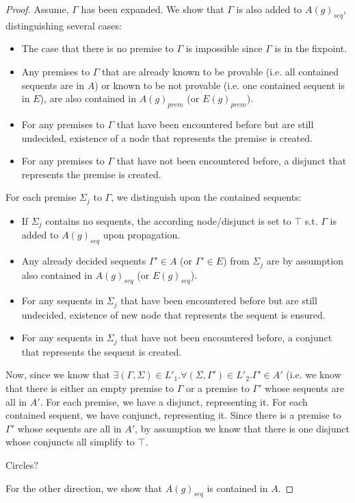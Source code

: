 \documentclass{llncs}
\begin{document}
\begin{lemma}
\begin{proof}
Assume, $\Gamma$ has been expanded. We show that $\Gamma$ is also added to $A(g)_{seq}$, distinguishing
several cases:
\begin{itemize}
\item The case that there is no premise to $\Gamma$ is impossible since $\Gamma$ is in the fixpoint.
\item Any premises to $\Gamma$ that are already known to be provable (i.e. all contained sequents are in $A$) or known to be 
not provable (i.e. one contained sequent is in $E$), are also contained in $A(g)_{prem}$ (or $E(g)_{prem}$).
\item For any premises to $\Gamma$ that have been encountered before but are still undecided, existence of a node that represents the
premise is created.
\item For any premises to $\Gamma$ that have not been encountered before, a disjunct that represents the
premise is created.
\end{itemize}
For each premise $\Sigma_j$ to $\Gamma$, we distinguish upon the contained sequents:
\begin{itemize}
\item If $\Sigma_j$ contains no sequents, the according node/disjunct is set to $\top$ s.t. $\Gamma$ is added to $A(g)_{seq}$ upon propagation.
\item Any already decided sequents $\Gamma'\in A$ (or $\Gamma'\in E$) from $\Sigma_j$ are by assumption also contained in
$A(g)_{seq}$ (or $E(g)_{seq}$).
\item For any sequents in $\Sigma_j$ that have been encountered before but are still undecided, existence of new node that represents the
sequent is ensured.
\item For any sequents in $\Sigma_j$ that have not been encountered before, a conjunct that represents the
sequent is created.
\end{itemize}

Now, since we know that $\exists(\Gamma,\Sigma)\in L'_1.
\forall(\Sigma,\Gamma')\in L'_2.\Gamma'\in A'$ (i.e. we know that there is either an empty premise to $\Gamma$ or
a premise to $\Gamma'$ whose sequents are all in $A'$. For each premise, we have a disjunct, representing it. For each
contained sequent, we have conjunct, representing it. Since there is a premise to $\Gamma'$ whose sequents are all in $A'$,
by assumption we know that there is one disjunct whose conjuncts all simplify to $\top$.

Circles?

For the other direction, we show that $A(g)_{seq}$ is contained in $A$.


\end{proof}
\end{lemma}
\end{document}
